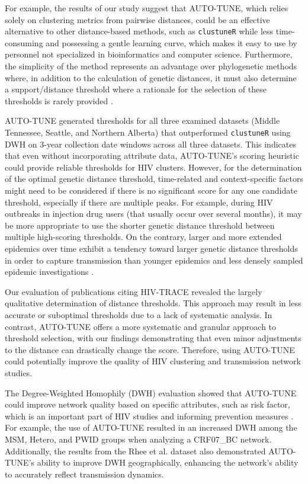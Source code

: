 \documentclass[utf8]{FrontiersinHarvard} %
\begin{document}
For example, the results of our study suggest that AUTO-TUNE, which relies
solely on clustering metrics from pairwise distances, could be an effective
alternative to other distance-based methods, such as {\tt clustuneR} while less
time-consuming and possessing a gentle learning curve, which makes it easy to
use by personnel not specialized in bioinformatics and computer science.
Furthermore, the simplicity of the method represents an advantage over
phylogenetic methods where, in addition to the calculation of genetic
distances, it must also determine a support/distance threshold where a
rationale for the selection of these thresholds is rarely provided
\citep{junqueira_factors_2019}.

AUTO-TUNE generated thresholds for all three examined datasets (Middle
Tennessee, Seattle, and Northern Alberta) that outperformed {\tt clustuneR}
using DWH on 3-year collection date windows across all three datasets. This
indicates that even without incorporating attribute data, AUTO-TUNE's scoring
heuristic could provide reliable thresholds for HIV clusters. However, for the
determination of the optimal genetic distance threshold, time-related and
context-specific factors might need to be considered if there is no significant
score for any one candidate threshold, especially if there are multiple peaks.
For example, during HIV outbreaks in injection drug users (that usually occur
over several months), it may be more appropriate to use the shorter genetic
distance threshold \citep{peters_hiv_2016,campbell_detailed_2017} between
multiple high-scoring thresholds. On the contrary, larger and more extended
epidemics over time exhibit a tendency toward larger genetic distance
thresholds in order to capture transmission than younger epidemics and less
densely sampled epidemic investigations
\citep{patil_exploring_2022,leung_molecular_2019,di_giallonardo_subtype-specific_2021}.

Our evaluation of publications citing HIV-TRACE revealed the largely
qualitative determination of distance thresholds. This approach may result in
less accurate or suboptimal thresholds due to a lack of systematic analysis. In
contrast, AUTO-TUNE offers a more systematic and granular approach to threshold
selection, with our findings demonstrating that even minor adjustments to the
distance can drastically change the score. Therefore, using AUTO-TUNE could
potentially improve the quality of HIV clustering and transmission network
studies.

The Degree-Weighted Homophily (DWH) evaluation showed that AUTO-TUNE could
improve network quality based on specific attributes, such as risk factor,
which is an important part of HIV studies and informing prevention measures
\citep{potterat_risk_2002,fujimoto_methodological_2021}. For example, the use
of AUTO-TUNE resulted in an increased DWH among the MSM, Hetero, and PWID
groups when analyzing a CRF07\_BC network. Additionally, the results from the
Rhee et al. dataset also demonstrated AUTO-TUNE's ability to improve DWH
geographically, enhancing the network's ability to accurately reflect
transmission dynamics.
\end{document}
